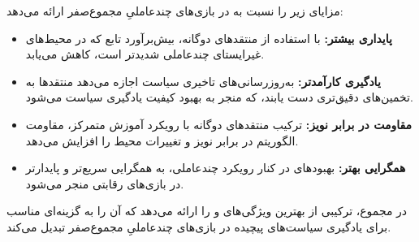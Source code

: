  مزایای زیر را نسبت به  در بازی‌های چندعاملیِ مجموع­‌صفر ارائه می‌دهد:

\begin{itemize}
    \item \textbf{پایداری بیشتر:} با استفاده از منتقدهای دوگانه، بیش‌برآورد تابع  که در محیط‌های غیرایستای چند­عاملی شدیدتر است، کاهش می‌یابد.
    \item \textbf{یادگیری کارآمدتر:} به‌روزرسانی‌های تاخیری سیاست اجازه می‌دهد منتقدها به تخمین‌های دقیق‌تری دست یابند، که منجر به بهبود کیفیت یادگیری سیاست می‌شود.
    \item \textbf{مقاومت در برابر نویز:} ترکیب منتقدهای دوگانه با رویکرد آموزش متمرکز، مقاومت الگوریتم در برابر نویز و تغییرات محیط را افزایش می‌دهد.
    \item \textbf{همگرایی بهتر:} بهبودهای  در کنار رویکرد چند­عاملی، به همگرایی سریع‌تر و پایدارتر در بازی‌های رقابتی منجر می‌شود.
\end{itemize}

در مجموع،  ترکیبی از بهترین ویژگی‌های  و  را ارائه می‌دهد که آن را به گزینه‌ای مناسب برای یادگیری سیاست‌های پیچیده در بازی‌های چندعاملیِ مجموع­‌صفر تبدیل می‌کند.